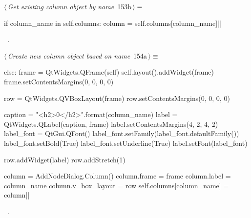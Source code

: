 \documentclass[%
    a4paper,    %
    justified,  %
    nobib,      %
    openany     %
]{tufte-book}
\begin{document}
%
\begin{flushleft} \small
\begin{minipage}{\linewidth}\label{scrap158}\raggedright\small
{} $\langle\,${\itshape Get existing column object by name}\nobreak\ {\footnotesize {153b}}$\,\rangle\equiv$
\vspace{-1ex}
\begin{pythoncode}
if column_name in self.columns:
    column = self.columns[column_name]|\NWsep|
\end{pythoncode}
\vspace{1.5ex}
\footnotesize
\begin{list}{}{\setlength{\itemsep}{-\parsep}\setlength{\itemindent}{-\leftmargin}}
\item \NWtxtMacroRefIn\ .

\item{}
\end{list}
\end{minipage}\vspace{4ex}
\end{flushleft}
%
\begin{flushleft} \small
\begin{minipage}{\linewidth}\label{scrap159}\raggedright\small
{} $\langle\,${\itshape Create new column object based on name}\nobreak\ {\footnotesize {154a}}$\,\rangle\equiv$
\vspace{-1ex}
\begin{pythoncode}
else:
    frame = QtWidgets.QFrame(self)
    self.layout().addWidget(frame)
    frame.setContentsMargins(0, 0, 0, 0)

    row = QtWidgets.QVBoxLayout(frame)
    row.setContentsMargins(0, 0, 0, 0)

    caption = "<h2>{0}</h2>".format(column_name)
    label = QtWidgets.QLabel(caption, frame)
    label.setContentsMargins(4, 2, 4, 2)
    label_font = QtGui.QFont()
    label_font.setFamily(label_font.defaultFamily())
    label_font.setBold(True)
    label_font.setUnderline(True)
    label.setFont(label_font)

    row.addWidget(label)
    row.addStretch(1)

    column = AddNodeDialog.Column()
    column.frame = frame
    column.label = column_name
    column.v_box_layout = row
    self.columns[column_name] = column|\NWsep|
\end{pythoncode}
\vspace{1.5ex}
\footnotesize
\begin{list}{}{\setlength{\itemsep}{-\parsep}\setlength{\itemindent}{-\leftmargin}}
\item \NWtxtMacroRefIn\ .

\item{}
\end{list}
\end{minipage}\vspace{4ex}
\end{flushleft}
\end{document}
